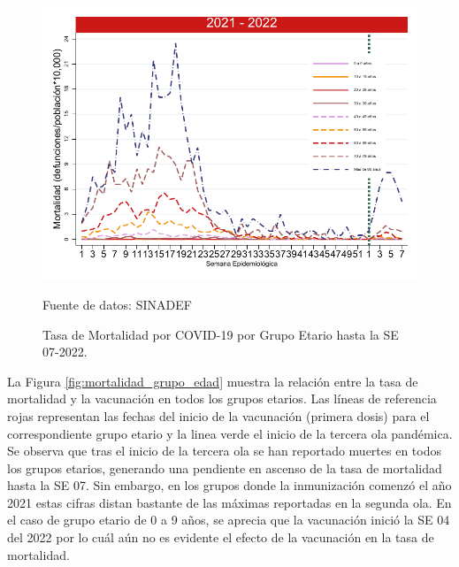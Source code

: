 \documentclass[12pt,a4paper,openany]{book}
\begin{document}
\begin{figure}[h]
	\caption{Tasa de Mortalidad por COVID-19 por Grupo Etario hasta la SE 07-2022.}\label{fig:mortalidad_edad}
	\begin{center}
		\includegraphics[width=0.65\linewidth]{../figuras/mortalidad_edad_2021_2022.pdf}
	\end{center}
	{\footnotesize Fuente de datos: SINADEF} 
\end{figure}


La Figura \ref{fig:mortalidad_grupo_edad} muestra la relación entre la tasa de mortalidad y la vacunación en todos los grupos etarios. Las líneas de referencia rojas representan las fechas del inicio de la vacunación (primera dosis) para el correspondiente grupo etario y la linea verde el inicio de la tercera ola pandémica. Se observa que tras el inicio de la tercera ola se han reportado muertes en todos los grupos etarios, generando una pendiente en ascenso de la tasa de mortalidad hasta la SE 07. Sin embargo, en los grupos donde la inmunización comenzó el año 2021 estas cifras distan bastante de las máximas reportadas en la segunda ola. En el caso de grupo etario de 0 a 9 años, se aprecia que la vacunación inició la SE 04 del 2022 por lo cuál aún no es evidente el efecto de la vacunación en la tasa de mortalidad. 
\end{document}
